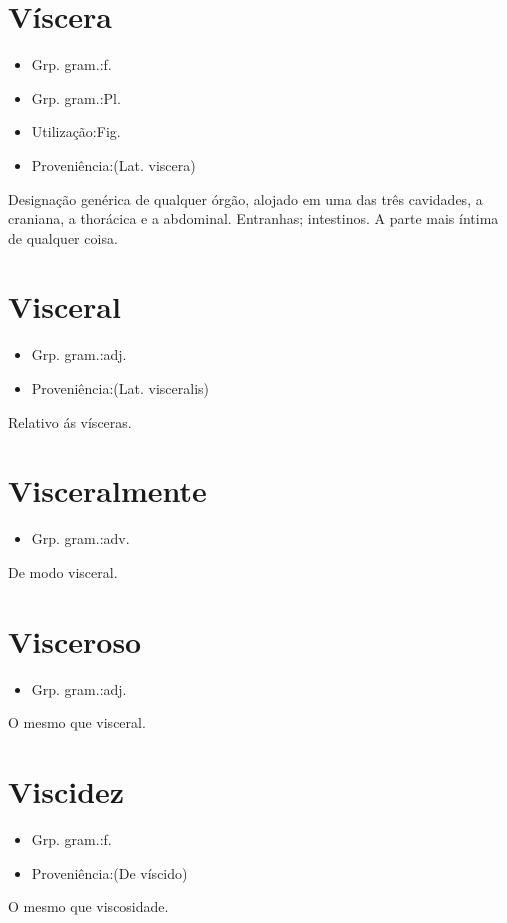 \documentclass{article}
\begin{document}
\section{Víscera}
\begin{itemize}
\item {Grp. gram.:f.}
\end{itemize}
\begin{itemize}
\item {Grp. gram.:Pl.}
\end{itemize}
\begin{itemize}
\item {Utilização:Fig.}
\end{itemize}
\begin{itemize}
\item {Proveniência:(Lat. \textunderscore viscera\textunderscore )}
\end{itemize}
Designação genérica de qualquer órgão, alojado em uma das três cavidades, a craniana, a thorácica e a abdominal.
Entranhas; intestinos.
A parte mais íntima de qualquer coisa.
\section{Visceral}
\begin{itemize}
\item {Grp. gram.:adj.}
\end{itemize}
\begin{itemize}
\item {Proveniência:(Lat. \textunderscore visceralis\textunderscore )}
\end{itemize}
Relativo ás vísceras.
\section{Visceralmente}
\begin{itemize}
\item {Grp. gram.:adv.}
\end{itemize}
De modo visceral.
\section{Visceroso}
\begin{itemize}
\item {Grp. gram.:adj.}
\end{itemize}
O mesmo que \textunderscore visceral\textunderscore .
\section{Viscidez}
\begin{itemize}
\item {Grp. gram.:f.}
\end{itemize}
\begin{itemize}
\item {Proveniência:(De \textunderscore víscido\textunderscore )}
\end{itemize}
O mesmo que \textunderscore viscosidade\textunderscore .
\end{document}
